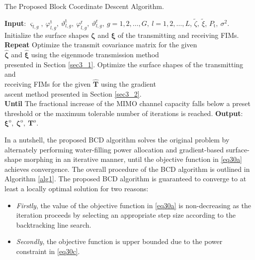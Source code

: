 \documentclass[lettersize,journal]{IEEEtran}
\begin{document}
\begin{algorithm}[!t]
\caption{The Proposed Block Coordinate Descent Algorithm.}
\begin{algorithmic}[1]
\STATE \textbf{Input}: $\varsigma _{l,g},\ \varphi_{l,g}^{\textrm{t}},\ \vartheta_{l,g}^{\textrm{t}},\ \varphi_{l,g}^{\textrm{r}},\ \vartheta_{l,g}^{\textrm{r}},\ g=1,2,\ldots,G,\ l=1,2,\ldots,L$, $\tilde{\zeta},\ \tilde{\xi}$, $P_{\textrm{t}},\ \sigma^2$.
\STATE Initialize the surface shapes $\boldsymbol{\zeta}$ and $\boldsymbol{\xi}$ of the transmitting and receiving FIMs.
\STATE \textbf{Repeat}
\STATE \hspace{0.5cm} Optimize the transmit covariance matrix for the given\\
\hspace{0.5cm} $\hat{\boldsymbol{\zeta}}$ and $\hat{\boldsymbol{\xi}}$ using the eigenmode transmission method\\
\hspace{0.5cm} presented in Section \ref{sec3_1}.
\STATE \hspace{0.5cm} Optimize the surface shapes of the transmitting and\\
\hspace{0.5cm} receiving FIMs for the given $\hat{\mathbf{T}}$ using the gradient\\
\hspace{0.5cm} ascent method presented in Section \ref{sec3_2}.\\
\STATE \textbf{Until} The fractional increase of the MIMO channel capacity falls below a preset threshold or the maximum tolerable number of iterations is reached.
\STATE \textbf{Output}: $\boldsymbol{\xi}^{\textrm{o}},\ \boldsymbol{\zeta}^{\textrm{o}},\ \mathbf{T}^{\textrm{o}}$.
\end{algorithmic}
\label{alg1}
\end{algorithm}
In a nutshell, the proposed BCD algorithm solves the original problem by alternately performing water-filling power allocation and gradient-based surface-shape morphing in an iterative manner, until the objective function in \eqref{eq30a} achieves convergence. The overall procedure of the BCD algorithm is outlined in Algorithm \ref{alg1}. The proposed BCD algorithm is guaranteed to converge to at least a locally optimal solution for two reasons:
\begin{itemize}
 \item \emph{Firstly}, the value of the objective function in \eqref{eq30a} is non-decreasing as the iteration proceeds by selecting an appropriate step size according to the backtracking line search.
 \item \emph{Secondly}, the objective function is upper bounded due to the power constraint in \eqref{eq30c}.
\end{itemize}
\end{document}
